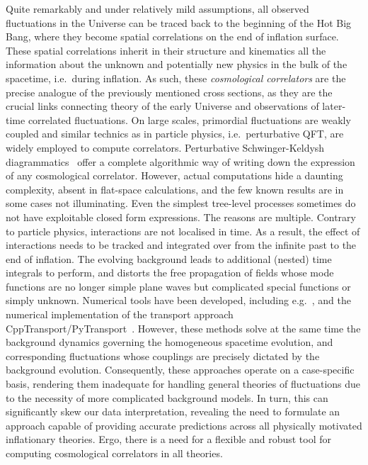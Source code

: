 \documentclass[11pt]{article}
\numberwithin{equation}{section} %
\begin{document}
\vskip 4pt
Quite remarkably and under relatively mild assumptions, all observed fluctuations in the Universe can be traced back to the beginning of the Hot Big Bang, where they become spatial correlations on the end of inflation surface. These spatial correlations inherit in their structure and kinematics all the information about the unknown and potentially new physics in the bulk of the spacetime, i.e.~during inflation. As such, these \textit{cosmological correlators} are the precise analogue of the previously mentioned cross sections, as they are the crucial links connecting theory of the early Universe and observations of later-time correlated fluctuations. On large scales, primordial fluctuations are weakly coupled and similar technics as in particle physics, i.e.~perturbative QFT, are widely employed to compute correlators. Perturbative Schwinger-Keldysh diagrammatics~\cite{Weinberg:2005vy, Chen:2017ryl} offer a complete algorithmic way of writing down the expression of any cosmological correlator. However, actual computations hide a daunting complexity, absent in flat-space calculations, and the few known results are in some cases not illuminating. Even the simplest tree-level processes sometimes do not have exploitable closed form expressions. The reasons are multiple. Contrary to particle physics, interactions are not localised in time. As a result, the effect of interactions needs to be tracked and integrated over from the infinite past to the end of inflation. The evolving background leads to additional (nested) time integrals to perform, and distorts the free propagation of fields whose mode functions are no longer simple plane waves but complicated special functions or simply unknown. Numerical tools have been developed, including e.g.~\cite{Hazra:2012yn, Sreenath:2014nca}, and the numerical implementation of the transport approach \textsf{CppTransport}/\textsf{PyTransport}~\cite{Dias:2016rjq, Seery:2016lko, Mulryne:2016mzv, Ronayne:2017qzn}. However, these methods solve at the same time the background dynamics governing the homogeneous spacetime evolution, and corresponding fluctuations whose couplings are precisely dictated by the background evolution. Consequently, these approaches operate on a case-specific basis, rendering them inadequate for handling general theories of fluctuations due to the necessity of more complicated background models. In turn, this can significantly skew our data interpretation, revealing the need to formulate an approach capable of providing accurate predictions across all physically motivated inflationary theories. Ergo, there is a need for a flexible and robust tool for computing cosmological correlators in all theories.
\end{document}
